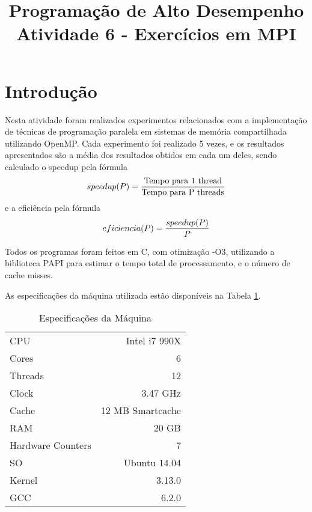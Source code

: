 \documentclass[conference]{IEEEtran}
\begin{document}
\title{Programação de Alto Desempenho\\
\large Atividade 6 - Exercícios em MPI}

\author{
 }

\maketitle


\section{Introdução}
Nesta atividade foram realizados experimentos relacionados com a implementação de técnicas de programação paralela em sistemas de memória compartilhada utilizando OpenMP.
Cada experimento foi realizado 5 vezes, e os resultados apresentados são a média dos resultados obtidos em cada um deles, sendo calculado o speedup pela fórmula $$speedup(P) = {{\textrm{Tempo para 1 thread} }\over{\textrm{Tempo para P threads} }}$$ e a eficiência pela fórmula $$eficiencia(P) = {{speedup(P)}\over{P}}$$

Todos os programas foram feitos em C, com otimização -O3, utilizando a biblioteca PAPI para estimar o tempo total de processamento, e o número de cache misses.


As especificações da máquina utilizada estão disponíveis na Tabela \ref{tab:cpu}.

\begin{table}[htb!]
\centering
\caption{Especificações da Máquina}
\label{tab:cpu}
\begin{tabular}{lr}
CPU & Intel i7 990X \\
Cores & 6\\
Threads & 12\\
Clock & 3.47 GHz\\
Cache& 12 MB Smartcache \\
RAM & 20 GB \\
Hardware Counters & 7 \\
SO & Ubuntu 14.04 \\
Kernel & 3.13.0 \\
GCC &  6.2.0\\
\end{tabular}
\end{table}
\end{document}
